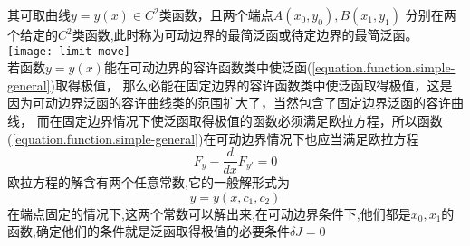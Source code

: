 \documentclass{book}
\begin{document}
其可取曲线$y = y(x) \in C^2$类函数，且两个端点$A(x_0,y_0),B(x_1,y_1)$ 分别在两个给定的$C^2$类函数,此时称为可动边界的最简泛函或待定边界的最简泛函。\\

\texttt{[image: limit-move]}\\

若函数$y=y(x)$能在可动边界的容许函数类中使泛函(\ref{equation.function.simple-general})取得极值，
那么必能在固定边界的容许函数类中使泛函取得极值，这是因为可动边界泛函的容许曲线类的范围扩大了，当然包含了固定边界泛函的容许曲线，
而在固定边界情况下使泛函取得极值的函数必须满足欧拉方程，所以函数(\ref{equation.function.simple-general})在可动边界情况下也应当满足欧拉方程
$$
F_y - \frac{d}{dx}F_{y'} =0
$$
欧拉方程的解含有两个任意常数,它的一般解形式为
$$y=y(x,c_1,c_2)$$
在端点固定的情况下,这两个常数可以解出来,在可动边界条件下,他们都是$x_0,x_1$的函数,确定他们的条件就是泛函取得极值的必要条件$\delta J=0$
\end{document}
